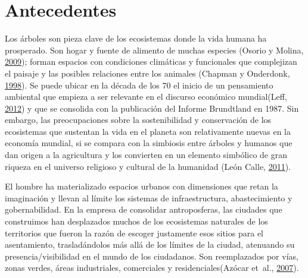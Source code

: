 \documentclass[12pt,a4paper,openany]{book}
\theoremstyle{definition}
\theoremstyle{definition}
\theoremstyle{definition}
\theoremstyle{remark}
\begin{document}
\section{Antecedentes}\label{antecedentes}

Los árboles son pieza clave de los ecosistemas donde la vida humana ha
prosperado. Son hogar y fuente de alimento de muchas especies (Osorio y
Molina, \protect\hyperlink{ref-osorio_vuelo_2009}{2009}); forman
espacios con condiciones climáticas y funcionales que complejizan el
paisaje y las posibles relaciones entre los animales (Chapman y
Onderdonk, \protect\hyperlink{ref-chapman_forests_1998}{1998}). Se puede
ubicar en la década de los 70 el inicio de un pensamiento ambiental que
empieza a ser relevante en el discurso económico mundial(Leff,
\protect\hyperlink{ref-leff_pensamiento_2012}{2012}) y que se consolida
con la publicación del Informe Brundtland en 1987. Sin embargo, las
preocupaciones sobre la sostenibilidad y conservación de los ecosistemas
que sustentan la vida en el planeta son relativamente nuevas en la
economía mundial, si se compara con la simbiosis entre árboles y humanos
que dan origen a la agricultura y los convierten en un elemento
simbólico de gran riqueza en el universo religioso y cultural de la
humanidad (León Calle,
\protect\hyperlink{ref-leon_calle_arboles_2011}{2011}).

El hombre ha materializado espacios urbanos con dimensiones que retan la
imaginación y llevan al límite los sistemas de infraestructura,
abastecimiento y gobernabilidad. En la empresa de consolidar
antroposferas, las ciudades que construimos han desplazados muchos de
los ecosistemas naturales de los territorios que fueron la razón de
escoger justamente esos sitios para el asentamiento, trasladándolos más
allá de los límites de la ciudad, atenuando su presencia/visibilidad en
el mundo de los ciudadanos. Son reemplazados por vías, zonas verdes,
áreas industriales, comerciales y residenciales(Azócar et~al.,
\protect\hyperlink{ref-azocar_urbanization_2007}{2007}).
\end{document}
